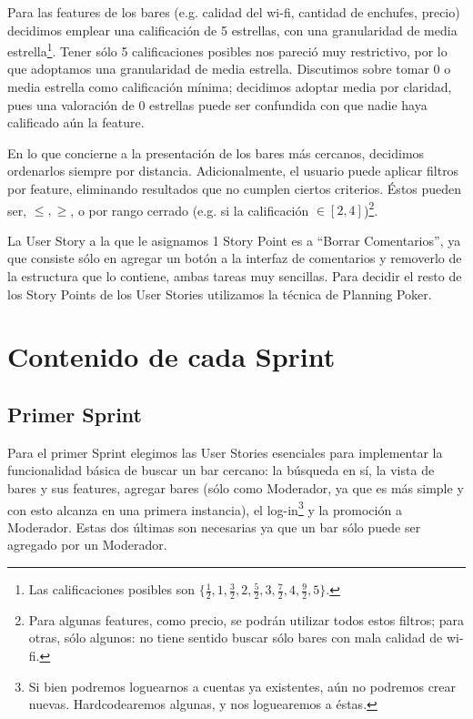\documentclass[hidelinks,a4paper,11pt, nofootinbib]{article}
\begin{document}
\par Para las features de los bares (e.g. calidad del wi-fi, cantidad de enchufes, precio) decidimos emplear una calificación de 5 estrellas, con una granularidad de media estrella\footnote{Las calificaciones posibles son $\{ \frac{1}{2}, 1, \frac{3}{2}, 2, \frac{5}{2}, 3, \frac{7}{2}, 4, \frac{9}{2}, 5 \}$.}.
Tener sólo 5 calificaciones posibles nos pareció muy restrictivo, por lo que adoptamos una granularidad de media estrella.
Discutimos sobre tomar 0 o media estrella como calificación mínima; decidimos adoptar media por claridad, pues una valoración de 0 estrellas puede ser confundida con que nadie haya calificado aún la feature.

\par En lo que concierne a la presentación de los bares más cercanos, decidimos ordenarlos siempre por distancia.
Adicionalmente, el usuario puede aplicar filtros por feature, eliminando resultados que no cumplen ciertos criterios. 
Éstos pueden ser, $\leqslant, \geqslant$, o por rango cerrado (e.g. si la calificación $\in [2, 4]$)\footnote{Para algunas features, como precio, se podrán utilizar todos estos filtros; para otras, sólo algunos: no tiene sentido buscar sólo bares con mala calidad de wi-fi.}.

\par La User Story a la que le asignamos 1 Story Point es a ``Borrar Comentarios'', ya que consiste sólo en agregar un botón a la interfaz de comentarios y removerlo de la estructura que lo contiene, ambas tareas muy sencillas. Para decidir el resto de los Story Points de los User Stories utilizamos la técnica de Planning Poker.

\section{Contenido de cada Sprint}

\subsection{Primer Sprint}

\par Para el primer Sprint elegimos las User Stories esenciales para implementar la funcionalidad básica de buscar un bar cercano: la búsqueda en sí, la vista de bares y sus features, agregar bares (sólo como Moderador, ya que es más simple y con esto alcanza en una primera instancia), el log-in\footnote{Si bien podremos loguearnos a cuentas ya existentes, aún no podremos crear nuevas. Hardcodearemos algunas, y nos loguearemos a éstas.} y la promoción a Moderador.
Estas dos últimas son necesarias ya que un bar sólo puede ser agregado por un Moderador.
\end{document}
